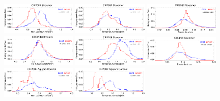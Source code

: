 \documentclass[baaa]{baaa}
\begin{document}
\begin{figure}
  \centering
  \includegraphics[width=0.32\textwidth]{figuras/proceeding_2082_demt_awsom_streamer_ne_1055.eps}
  \includegraphics[width=0.32\textwidth]{figuras/proceeding_2082_demt_awsom_streamer_Tm.eps}
  \includegraphics[width=0.32\textwidth]{figuras/proceeding_2082_demt_awsom_streamer_lambda_n.eps}\\
  \includegraphics[width=0.32\textwidth]{figuras/proceeding_2208_demt_awsom_streamer_ne_1055.eps}
  \includegraphics[width=0.32\textwidth]{figuras/proceeding_2208_demt_awsom_streamer_Tm.eps}
  \includegraphics[width=0.32\textwidth]{figuras/proceeding_2208_demt_awsom_streamer_lambda_n.eps}
  \includegraphics[width=0.32\textwidth]{figuras/proceeding_2082_demt_awsom_CH_ne_1055.eps}
  \includegraphics[width=0.32\textwidth]{figuras/proceeding_2082_demt_awsom_CH_Tm.eps}

\end{figure}
\end{document}
